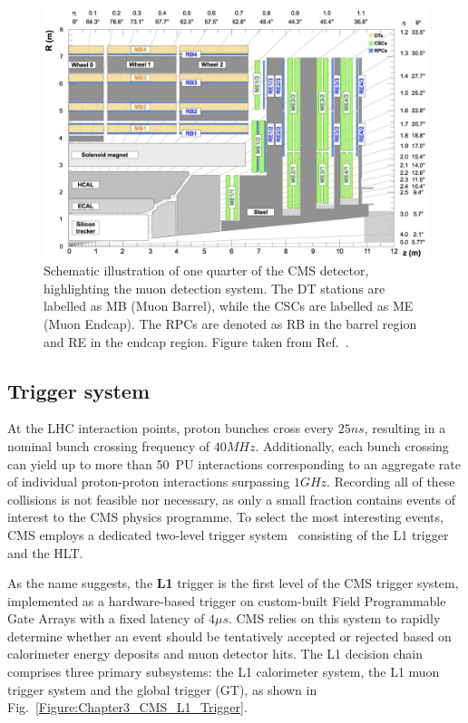 \begin{figure}[h]
\centering
\includegraphics[width= 1.0\textwidth]{Figures/Chapter3/CMS_Muon_System.pdf}
\caption{Schematic illustration of one quarter of the CMS detector, highlighting the muon detection system. The DT stations are labelled as MB (Muon Barrel), while the CSCs are labelled as ME (Muon Endcap). The RPCs are denoted as RB in the barrel region and RE in the endcap region. Figure taken from Ref.~\cite{CMS_Muon_System_Performance}.}
\label{Figure:Chapter3_CMS_Muon_System}
\end{figure}

\subsection{Trigger system}

At the LHC interaction points, proton bunches cross every $25\unit{ns}$, resulting in a nominal bunch crossing frequency of $40\unit{MHz}$. Additionally, each bunch crossing can yield up to more than 50~PU interactions corresponding to an aggregate rate of individual proton-proton interactions surpassing $1\unit{GHz}$. Recording all of these collisions is not feasible nor necessary, as only a small fraction contains events of interest to the CMS physics programme. To select the most interesting events, CMS employs a dedicated two-level trigger system~\cite{CMS_Trigger} consisting of the \ac{L1} trigger and the \ac{HLT}.

As the name suggests, the \textbf{L1} trigger is the first level of the CMS trigger system, implemented as a hardware-based trigger on custom-built Field Programmable Gate Arrays with a fixed latency of $4\unit{\mu s}$. CMS relies on this system to rapidly determine whether an event should be tentatively accepted or rejected based on calorimeter energy deposits and muon detector hits. The L1 decision chain comprises three primary subsystems: the L1 calorimeter system, the L1 muon trigger system and the global trigger (GT), as shown in Fig.~\ref{Figure:Chapter3_CMS_L1_Trigger}.

